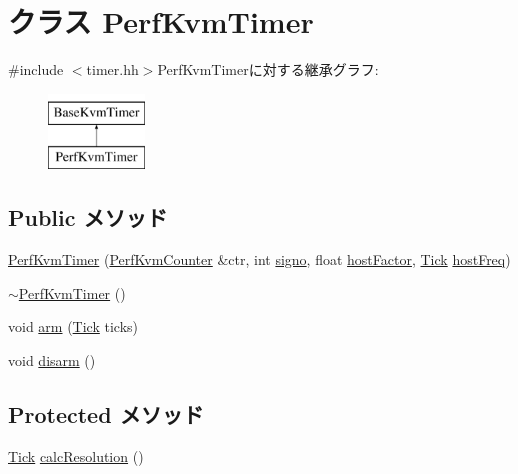\hypertarget{classPerfKvmTimer}{
\section{クラス PerfKvmTimer}
\label{classPerfKvmTimer}
}


{\ttfamily \#include $<$timer.hh$>$}PerfKvmTimerに対する継承グラフ:\begin{figure}[H]
\begin{center}
\leavevmode
\includegraphics[height=2cm]{classPerfKvmTimer}
\end{center}
\end{figure}
\subsection*{Public メソッド}
\begin{DoxyCompactItemize}
\item 
\hyperlink{classPerfKvmTimer_a9435bd1cf661fdb4e35b2a733d94f92d}{PerfKvmTimer} (\hyperlink{classPerfKvmCounter}{PerfKvmCounter} \&ctr, int \hyperlink{classBaseKvmTimer_a68acd751895efa9ac5a6461017f1d2d8}{signo}, float \hyperlink{classBaseKvmTimer_a0ef366aa4bbbcdc2f7eeb7fcd3962dde}{hostFactor}, \hyperlink{base_2types_8hh_a5c8ed81b7d238c9083e1037ba6d61643}{Tick} \hyperlink{classBaseKvmTimer_af880b55be2bf83ac65eb9b0abe62ae49}{hostFreq})
\item 
\hyperlink{classPerfKvmTimer_a0095b8dff4f2db7d8d44674689127373}{$\sim$PerfKvmTimer} ()
\item 
void \hyperlink{classPerfKvmTimer_a5041ff590d50fcb1f0f5149b2e7eb4bb}{arm} (\hyperlink{base_2types_8hh_a5c8ed81b7d238c9083e1037ba6d61643}{Tick} ticks)
\item 
void \hyperlink{classPerfKvmTimer_a9882bfa120cede575461197f2a13cd8b}{disarm} ()
\end{DoxyCompactItemize}
\subsection*{Protected メソッド}
\begin{DoxyCompactItemize}
\item 
\hyperlink{base_2types_8hh_a5c8ed81b7d238c9083e1037ba6d61643}{Tick} \hyperlink{classPerfKvmTimer_a02798cc202bebceef3ff0e3ff3d7b5b8}{calcResolution} ()
\end{DoxyCompactItemize}

